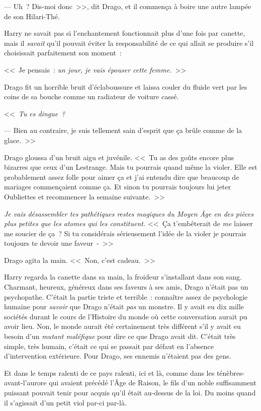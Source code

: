 --- Uh~? Dis-moi donc~>>, dit Drago, et il commença à boire une autre lampée de son Hilari-Thé.

Harry ne savait pas si l'enchantement fonctionnait plus d'une fois par canette, mais il \emph{savait} qu'il pouvait éviter la responsabilité de ce qui allait se produire s'il choisissait parfaitement son moment~:

<<~Je pensais~: \emph{un jour, je vais épouser cette femme.}~>>

Drago fit un horrible bruit d'éclaboussure et laissa couler du fluide vert par les coins de sa bouche comme un radiateur de voiture cassé.

<<~\emph{Tu es dingue~?}

--- Bien au contraire, je suis tellement sain d'esprit que ça brûle comme de la glace.~>>

Drago gloussa d'un bruit aigu et juvénile. <<~Tu as des goûts encore plus bizarres que ceux d'un Lestrange. Mais tu pourrais quand même la violer. Elle est probablement assez folle pour aimer ça et j'ai entendu dire que beaucoup de mariages commençaient comme ça. Et sinon tu pourrais toujours lui jeter Oubliettes et recommencer la semaine suivante.~>>

\emph{Je vais désassembler tes pathétiques restes magiques du Moyen Âge en des pièces plus petites que les atomes qui les constituent.} <<~Ça t'embêterait de \emph{me} laisser me soucier de ça~? Si tu considérais sérieusement l'idée de la violer je pourrais toujours te devoir une faveur~-~>>

Drago agita la main. <<~Non, c'est cadeau.~>>

Harry regarda la canette dans sa main, la froideur s'installant dans son sang. Charmant, heureux, généreux dans ses faveurs à ses amis, Drago n'était pas un psychopathe. C'était la partie triste et terrible~: connaître assez de psychologie humaine pour \emph{savoir} que Drago n'était \emph{pas} un monstre. Il y avait eu dix mille sociétés durant le cours de l'Histoire du monde où cette conversation aurait pu avoir lieu. Non, le monde aurait été certainement très différent s'il y avait eu besoin d'un \emph{mutant maléfique} pour dire ce que Drago avait dit. C'était très simple, très humain, c'était ce qui se passait par défaut en l'absence d'intervention extérieure. Pour Drago, ses ennemis n'étaient pas des gens.

Et dans le temps ralenti de ce pays ralenti, ici et là, comme dans les ténèbres-avant-l'aurore qui avaient précédé l'Âge de Raison, le fils d'un noble suffisamment puissant pouvait tenir pour acquis qu'il était au-dessus de la loi. Du moins quand il s'agissait d'un petit viol par-ci par-là.

